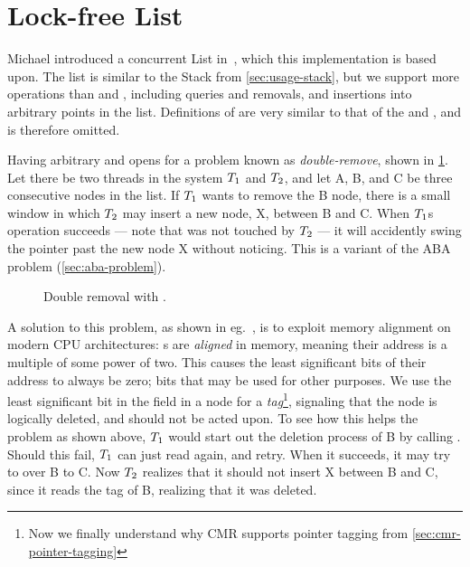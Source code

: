 \section{Lock-free List\label{sec:usage-list}}

Michael introduced a concurrent List in~\cite{harris2001pragmatic}, which this implementation is
based upon. The list is similar to the Stack from \cref{sec:usage-stack}, but we support more
operations than  and , including queries and removals, and insertions into
arbitrary points in the list. Definitions of  are very similar to that of the
 and , and is therefore omitted.

Having arbitrary  and  opens for a problem known as \emph{double-remove},
shown in \cref{fig:list-remove}. Let there be two threads in the system $T\sb{1}$ and $T\sb{2}$,
and let A, B, and C be three consecutive nodes in the list. If $T\sb{1}$ wants to remove the B
node, there is a small window in which $T\sb{2}$ may insert a new node, X, between B and C. When
$T\sb{1}$s  operation succeeds --- note that  was not touched by $T\sb{2}$
--- it will accidently swing the pointer past the new node X without noticing. This is a variant of
the ABA problem (\cref{sec:aba-problem}).

\begin{figure}[ht]
\centering

\caption{Double removal with \label{fig:list-remove}.}
\end{figure}

A solution to this problem, as shown in eg.~\cite{michael2002high}, is to exploit memory alignment
on modern CPU architectures: s are \emph{aligned} in memory, meaning their address is
a multiple of some power of two. This causes the least significant bits of their address to always
be zero; bits that may be used for other purposes. We use the least significant bit in the
 field in a node for a \emph{tag}\footnote{Now we finally understand why CMR supports
pointer tagging from \cref{sec:cmr-pointer-tagging}}, signaling that the node is logically deleted,
and should not be acted upon. To see how this helps the problem as shown above, $T\sb{1}$ would
start out the deletion process of B by calling . Should this
fail, $T\sb{1}$ can just read  again, and retry. When it succeeds, it may try to
  over B to C. Now $T\sb{2}$ realizes that it should not insert X between B
and C, since it reads the tag of B, realizing that it was deleted.


